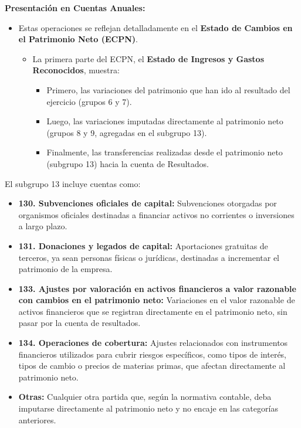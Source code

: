 \documentclass[
  paper=a4,
  ,captions=tableheading
]{scrbook}
\providecommand{\tightlist}{%
  \setlength{\itemsep}{0pt}\setlength{\parskip}{0pt}}
\begin{document}
\textbf{Presentación en Cuentas Anuales:}

\begin{itemize}
\tightlist
\item
  Estas operaciones se reflejan detalladamente en el \textbf{Estado de
  Cambios en el Patrimonio Neto (ECPN)}.

  \begin{itemize}
  \tightlist
  \item
    La primera parte del ECPN, el \textbf{Estado de Ingresos y Gastos
    Reconocidos}, muestra:

    \begin{itemize}
    \tightlist
    \item
      Primero, las variaciones del patrimonio que han ido al resultado
      del ejercicio (grupos 6 y 7).
    \item
      Luego, las variaciones imputadas directamente al patrimonio neto
      (grupos 8 y 9, agregadas en el subgrupo 13).
    \item
      Finalmente, las transferencias realizadas desde el patrimonio neto
      (subgrupo 13) hacia la cuenta de Resultados.
    \end{itemize}
  \end{itemize}
\end{itemize}

El subgrupo 13 incluye cuentas como:

\begin{itemize}
\tightlist
\item
  \textbf{130. Subvenciones oficiales de capital:} Subvenciones
  otorgadas por organismos oficiales destinadas a financiar activos no
  corrientes o inversiones a largo plazo.
\item
  \textbf{131. Donaciones y legados de capital:} Aportaciones gratuitas
  de terceros, ya sean personas físicas o jurídicas, destinadas a
  incrementar el patrimonio de la empresa.
\item
  \textbf{133. Ajustes por valoración en activos financieros a valor
  razonable con cambios en el patrimonio neto:} Variaciones en el valor
  razonable de activos financieros que se registran directamente en el
  patrimonio neto, sin pasar por la cuenta de resultados.
\item
  \textbf{134. Operaciones de cobertura:} Ajustes relacionados con
  instrumentos financieros utilizados para cubrir riesgos específicos,
  como tipos de interés, tipos de cambio o precios de materias primas,
  que afectan directamente al patrimonio neto.
\item
  \textbf{Otras:} Cualquier otra partida que, según la normativa
  contable, deba imputarse directamente al patrimonio neto y no encaje
  en las categorías anteriores.
\end{itemize}
\end{document}
